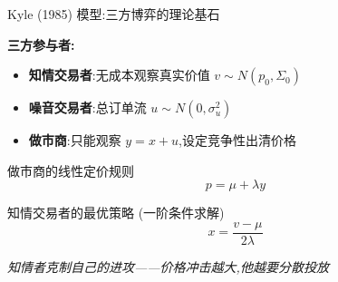 \documentclass[10pt,aspectratio=169]{beamer}
\begin{document}
\begin{frame}{Kyle (1985) 模型:三方博弈的理论基石}

  \textbf{三方参与者:}

  \begin{itemize}
    \item \textcolor{quantred}{\textbf{知情交易者}}:无成本观察真实价值 $v \sim N(p_0, \Sigma_0)$
    \item \textcolor{quantblue}{\textbf{噪音交易者}}:总订单流 $u \sim N(0, \sigma_u^2)$
    \item \textcolor{quantgreen}{\textbf{做市商}}:只能观察 $y = x + u$,设定竞争性出清价格
  \end{itemize}

  \vfill

  \begin{block}{做市商的线性定价规则}
    \[ p = \mu + \lambda y \]
  \end{block}

  \begin{block}{知情交易者的最优策略 (一阶条件求解)}
    \[ x = \frac{v - \mu}{2\lambda} \]
  \end{block}

  \vfill

  \centering\small\emph{知情者克制自己的进攻——价格冲击越大,他越要分散投放}

\end{frame}
\end{document}
